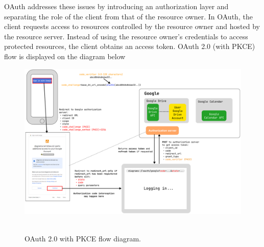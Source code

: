 %
%
%
%

OAuth addresses these issues by introducing an authorization layer and separating the role of the client
from that of the resource owner.
In OAuth, the client requests access to resources controlled by the resource owner and hosted by the resource server.
Instead of using the resource owner's credentials to access protected resources, the client obtains an access token.
OAuth 2.0 (with PKCE) flow is displayed on the diagram below
\begin{figure}[H]
    \centering
    \includegraphics[width=1\textwidth]{img/OAuthPkceScheme_1570_1055}
    ~\caption{OAuth 2.0 with PKCE flow diagram.}\label{fig:oauth_with_pkce}
\end{figure}

